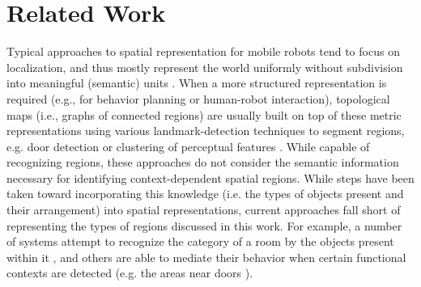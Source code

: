 \documentclass[letterpaper]{article}
\begin{document}
\section{Related Work}

Typical approaches to spatial representation for mobile robots tend to focus on localization, and thus mostly represent the world uniformly without subdivision into meaningful (semantic) units \cite{Thrun02a}. When a more structured representation is required (e.g., for behavior planning or human-robot interaction), topological maps (i.e., graphs of connected regions) are usually built on top of these metric representations using various landmark-detection techniques to segment regions, e.g. door detection \cite{Hawes/etal:2009b} or clustering of perceptual features \cite{Peltason/etal:2009a}. While capable of recognizing regions, these approaches do not consider the semantic information necessary for identifying context-dependent spatial regions. While steps have been taken toward incorporating this knowledge  (i.e. the types of objects present and their arrangement) into spatial representations, current approaches fall short of representing the types of regions discussed in this work. For example, a number of systems attempt to recognize the category of a room by the objects present within it \cite{Hawes/etal:2010b}, and others are able to mediate their behavior when certain functional contexts are detected (e.g. the areas near doors \cite{Zender2008a}).

\end{document}
